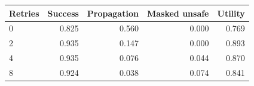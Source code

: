 \begin{tabular}{lrrrr}
\toprule
Retries & Success & Propagation & Masked unsafe & Utility \\
\midrule
0 & 0.825 & 0.560 & 0.000 & 0.769 \\
2 & 0.935 & 0.147 & 0.000 & 0.893 \\
4 & 0.935 & 0.076 & 0.044 & 0.870 \\
8 & 0.924 & 0.038 & 0.074 & 0.841 \\
\bottomrule
\end{tabular}
